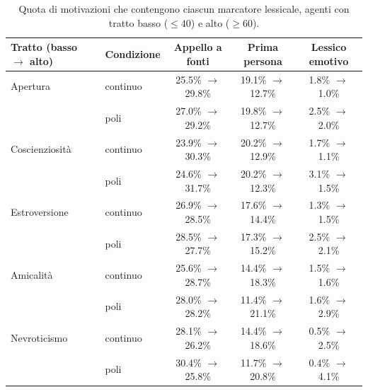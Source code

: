 \begin{table}[htbp]
\centering
\small
\begin{tabular}{llccc}
\toprule
Tratto (basso $\rightarrow$ alto) & Condizione & Appello a fonti & Prima persona & Lessico emotivo \\
\midrule
Apertura & continuo & 25.5\% $\rightarrow$ 29.8\% & 19.1\% $\rightarrow$ 12.7\% & 1.8\% $\rightarrow$ 1.0\% \\
 & poli & 27.0\% $\rightarrow$ 29.2\% & 19.8\% $\rightarrow$ 12.7\% & 2.5\% $\rightarrow$ 2.0\% \\
\addlinespace
Coscienziosità & continuo & 23.9\% $\rightarrow$ 30.3\% & 20.2\% $\rightarrow$ 12.9\% & 1.7\% $\rightarrow$ 1.1\% \\
 & poli & 24.6\% $\rightarrow$ 31.7\% & 20.2\% $\rightarrow$ 12.3\% & 3.1\% $\rightarrow$ 1.5\% \\
\addlinespace
Estroversione & continuo & 26.9\% $\rightarrow$ 28.5\% & 17.6\% $\rightarrow$ 14.4\% & 1.3\% $\rightarrow$ 1.5\% \\
 & poli & 28.5\% $\rightarrow$ 27.7\% & 17.3\% $\rightarrow$ 15.2\% & 2.5\% $\rightarrow$ 2.1\% \\
\addlinespace
Amicalità & continuo & 25.6\% $\rightarrow$ 28.7\% & 14.4\% $\rightarrow$ 18.3\% & 1.5\% $\rightarrow$ 1.6\% \\
 & poli & 28.0\% $\rightarrow$ 28.2\% & 11.4\% $\rightarrow$ 21.1\% & 1.6\% $\rightarrow$ 2.9\% \\
\addlinespace
Nevroticismo & continuo & 28.1\% $\rightarrow$ 26.2\% & 14.4\% $\rightarrow$ 18.6\% & 0.5\% $\rightarrow$ 2.5\% \\
 & poli & 30.4\% $\rightarrow$ 25.8\% & 11.7\% $\rightarrow$ 20.8\% & 0.4\% $\rightarrow$ 4.1\% \\
\bottomrule
\end{tabular}
\caption{Quota di motivazioni che contengono ciascun marcatore lessicale, agenti con tratto basso ($\leq 40$) e alto ($\geq 60$).}
\label{tab:reasoning-markers}
\end{table}
